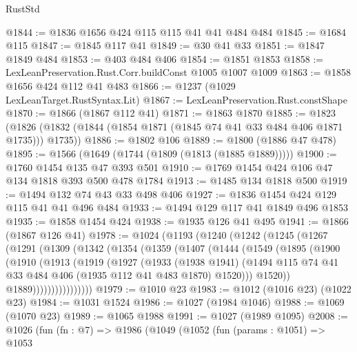 \begin{lexlean}{RustStd}
\begin{coremodule}
@1844 := @1836 @1656 @424 @115 @115 @41 @41 @484 @484
@1845 := @1684 @115
@1847 := @1845 @117 @41
@1849 := @30 @41 @33
@1851 := @1847 @1849 @484
@1853 := @403 @484 @406
@1854 := @1851 @1853
@1858 := LexLeanPreservation.Rust.Corr.buildConst @1005 @1007 @1009
@1863 := @1858 @1656 @424 @112 @41 @483
@1866 := @1237 (@1029 LexLeanTarget.RustSyntax.Lit)
@1867 := LexLeanPreservation.Rust.constShape
@1870 := @1866 (@1867 @112 @41)
@1871 := @1863 @1870
@1885 := @1823 (@1826 (@1832 (@1844 (@1854 @1871 (@1845 @74 @41 @33 @484 @406 @1871 @1735))) @1735))
@1886 := @1802 @106
@1889 := @1800 (@1886 @47 @478)
@1895 := @1566 (@1649 (@1744 (@1809 (@1813 (@1885 @1889)))))
@1900 := @1760 @1454 @135 @47 @393 @501
@1910 := @1769 @1454 @424 @106 @47 @134 @1818 @393 @500 @478 @1784
@1913 := @1485 @134 @1818 @500
@1919 := @1494 @132 @74 @43 @33 @498 @406
@1927 := @1836 @1454 @424 @129 @115 @41 @41 @496 @484
@1933 := @1494 @129 @117 @41 @1849 @496 @1853
@1935 := @1858 @1454 @424
@1938 := @1935 @126 @41 @495
@1941 := @1866 (@1867 @126 @41)
@1978 := @1024
    (@1193
      (@1240
        (@1242
          (@1245
            (@1267
              (@1291
                (@1309
                  (@1342
                    (@1354
                      (@1359
                        (@1407
                          (@1444
                            (@1549
                              (@1895
                                (@1900
                                  (@1910
                                    (@1913
                                      (@1919
                                        (@1927
                                          (@1933
                                            (@1938 @1941)
                                            (@1494
                                              @115
                                              @74
                                              @41
                                              @33
                                              @484
                                              @406
                                              (@1935 @112 @41 @483 @1870)
                                              @1520)))
                                        @1520))
                                    @1889))))))))))))))))
@1979 := @1010 @23
@1983 := @1012 (@1016 @23) (@1022 @23)
@1984 := @1031 @1524
@1986 := @1027 (@1984 @1046)
@1988 := @1069 (@1070 @23)
@1989 := @1065 @1988
@1991 := @1027 (@1989 @1095)
@2008 := @1026
    (fun (fn : @7) =>
    @1986
      (@1049
        (@1052
          (fun (params : @1051) =>
          @1053

\end{coremodule}
\end{lexlean}
